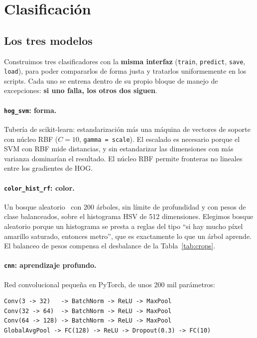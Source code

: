 \documentclass[11pt,a4paper]{article}
\begin{document}
\section{Clasificación}
\label{sec:clasificacion}

\subsection{Los tres modelos}

Construimos tres clasificadores con la \textbf{misma interfaz} (\texttt{train}, \texttt{predict},
\texttt{save}, \texttt{load}), para poder compararlos de forma justa y tratarlos uniformemente en
los scripts. Cada uno se entrena dentro de su propio bloque de manejo de excepciones: \textbf{si
uno falla, los otros dos siguen}.

\paragraph{\texttt{hog\_svm}: forma.}
Tubería de scikit-learn: estandarización más una máquina de vectores de soporte~\cite{svm} con
núcleo RBF ($C = 10$, \texttt{gamma = scale}). El escalado es necesario porque el SVM con RBF mide
distancias, y sin estandarizar las dimensiones con más varianza dominarían el resultado. El núcleo
RBF permite fronteras no lineales entre los gradientes de HOG.

\paragraph{\texttt{color\_hist\_rf}: color.}
Un bosque aleatorio~\cite{rf} con 200 árboles, sin límite de profundidad y con pesos de clase
balanceados, sobre el histograma HSV de 512 dimensiones. Elegimos bosque aleatorio porque un
histograma se presta a reglas del tipo \enquote{si hay mucho píxel amarillo saturado, entonces
metro}, que es exactamente lo que un árbol aprende. El balanceo de pesos compensa el desbalance de
la Tabla~\ref{tab:crops}.

\paragraph{\texttt{cnn}: aprendizaje profundo.}
Red convolucional pequeña en PyTorch, de unos 200 mil parámetros:

\begin{lstlisting}
Conv(3 -> 32)   -> BatchNorm -> ReLU -> MaxPool
Conv(32 -> 64)  -> BatchNorm -> ReLU -> MaxPool
Conv(64 -> 128) -> BatchNorm -> ReLU -> MaxPool
GlobalAvgPool -> FC(128) -> ReLU -> Dropout(0.3) -> FC(10)
\end{lstlisting}
\end{document}

